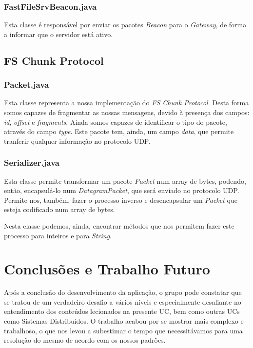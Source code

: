 \documentclass[11pt]{article}
\begin{document}
\subsubsection{FastFileSrvBeacon.java}

Esta classe é responsável por enviar os pacotes \textit{Beacon} para o \textit{Gateway}, de forma a informar que o servidor está ativo.

\subsection{FS Chunk Protocol}

\subsubsection{Packet.java}

Esta classe representa a nossa implementação do \textit{FS Chunk Protocol}. Desta forma somos capazes de fragmentar as nossas mensagens, devido à presença dos campos: \textit{id}, \textit{offset} e \textit{fragments}. Ainda somos capazes de identificar o tipo do pacote, através do campo \textit{type}. Este pacote tem, ainda, um campo \textit{data}, que permite tranferir qualquer informação no protocolo UDP.

\subsubsection{Serializer.java}

Esta classe permite transformar um pacote \textit{Packet} num array de bytes, podendo, então, encapsulá-lo num \textit{DatagramPacket}, que será enviado no protocolo UDP. Permite-nos, também, fazer o processo inverso e desencapsular um \textit{Packet} que esteja codificado num array de bytes.

Nesta classe podemos, ainda, encontrar métodos que nos permitem fazer este processo para inteiros e para \textit{String}.


\newpage
\section{Conclusões e Trabalho Futuro}

\par Após a conclusão do desenvolvimento da aplicação, o grupo pode constatar que se tratou de um verdadeiro desafio a vários níveis e especialmente desafiante no entendimento dos conteúdos lecionados na presente UC, bem como outras UCs como Sistemas Distribuídos. O trabalho acabou por se mostrar mais complexo e trabalhoso, o que nos levou a subestimar o tempo que necessitávamos para uma resolução do mesmo de acordo com os nossos padrões.\\
\end{document}
